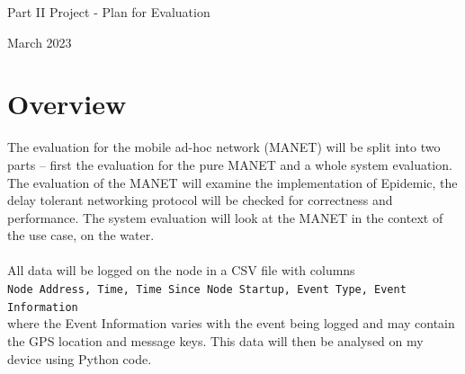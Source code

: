 \documentclass[10pt, a4paper]{article}
\begin{document}
\begin{center}
\Huge{Part II Project - Plan for Evaluation} \par
\Large{March 2023} \par
\end{center}
\par
\par

\section*{Overview}
The evaluation for the mobile ad-hoc network (MANET) will be split into two parts -- first the evaluation for the pure MANET and a whole system evaluation. The evaluation of the MANET will examine the implementation of Epidemic, the delay tolerant networking protocol will be checked for correctness and performance. The system evaluation will look at the MANET in the context of the use case, on the water.  \\ \\
All data will be logged on the node in a CSV file with columns \\ \verb'Node Address, Time, Time Since Node Startup, Event Type, Event Information' \\ where the Event Information varies with the event being logged and may contain the GPS location and message keys. This data will then be analysed on my device using Python code.
\end{document}
